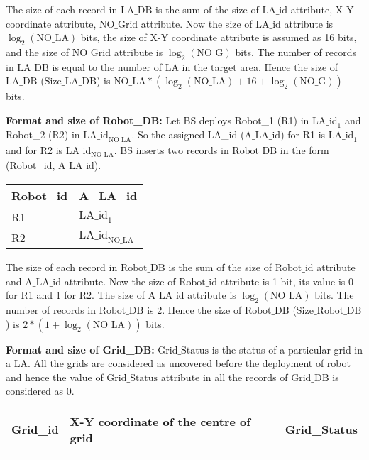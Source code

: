 \documentclass{article}
\begin{document}
The size of each record in $\text{LA\_DB}$ is the sum of the size of $\text{LA\_id}$ attribute, X-Y coordinate attribute, $\text{NO\_Grid}$ attribute. Now the size of $\text{LA\_id}$ attribute is $\log_2(\text{NO\_LA})$ bits, the size of X-Y coordinate attribute is assumed as 16 bits, and the size of $\text{NO\_Grid}$ attribute is $\log_2(\text{NO\_G})$ bits. The number of records in $\text{LA\_DB}$ is equal to the number of LA in the target area. Hence the size of $\text{LA\_DB}$ ($\text{Size\_LA\_DB}$) is $\text{NO\_LA} * (\log_2(\text{NO\_LA}) + 16 + \log_2(\text{NO\_G}))$ bits.

\noindent\textbf{Format and size of Robot\_DB:} Let BS deploys Robot\_1 (R1) in $\text{LA\_id}_1$ and Robot\_2 (R2) in $\text{LA\_id}_{\text{NO\_LA}}$. So the assigned LA\_id ($\text{A\_LA\_id}$) for R1 is $\text{LA\_id}_1$ and for R2 is $\text{LA\_id}_{\text{NO\_LA}}$. BS inserts two records in $\text{Robot\_DB}$ in the form (Robot\_id, $\text{A\_LA\_id}$).

\begin{center}
\begin{tabular}{|l|l|}
\hline
Robot\_id & A\_LA\_id \\
\hline
R1 & $\text{LA\_id}_1$ \\
R2 & $\text{LA\_id}_{\text{NO\_LA}}$ \\
\hline
\end{tabular}
\end{center}

The size of each record in $\text{Robot\_DB}$ is the sum of the size of $\text{Robot\_id}$ attribute and $\text{A\_LA\_id}$ attribute. Now the size of $\text{Robot\_id}$ attribute is 1 bit, its value is 0 for R1 and 1 for R2. The size of $\text{A\_LA\_id}$ attribute is $\log_2(\text{NO\_LA})$ bits. The number of records in $\text{Robot\_DB}$ is 2. Hence the size of $\text{Robot\_DB}$ ($\text{Size\_Robot\_DB}$) is $2 * (1 + \log_2(\text{NO\_LA}))$ bits.

\noindent\textbf{Format and size of Grid\_DB:} $\text{Grid\_Status}$ is the status of a particular grid in a LA. All the grids are considered as uncovered before the deployment of robot and hence the value of $\text{Grid\_Status}$ attribute in all the records of $\text{Grid\_DB}$ is considered as 0.


\begin{center}
\begin{tabular}{|l|l|l|}
\hline
Grid\_id & X-Y coordinate of the centre of grid & Grid\_Status \\
\hline
 & & \\ %
\hline
\end{tabular}
\end{center}
\end{document}
